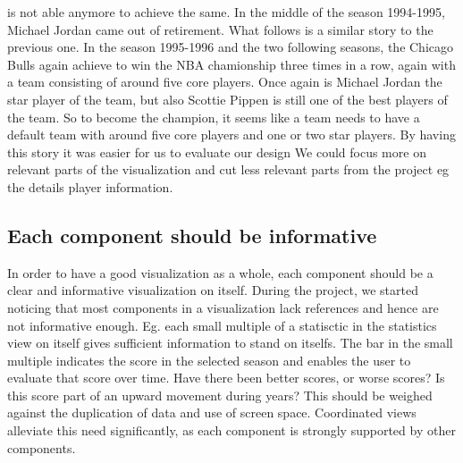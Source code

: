 \documentclass[]{sigchi}
\begin{document}
is not able anymore to achieve the same. In the middle of the season 1994-1995, Michael Jordan came out of retirement. What follows is a similar story to the previous one. In the season 1995-1996 and the two following seasons, the Chicago 
Bulls again achieve to win the NBA chamionship three times in a row, again with a  team consisting of around five core players. Once again is Michael Jordan the star 
player of the team, but also Scottie Pippen is still one of the best players of the team. So to become the champion, it seems like a team needs to have a default team with around five core players and one or two star players.
By having this story it was easier for us to evaluate our design We could focus more on relevant parts of the visualization and cut less relevant parts from the project eg the details player information.


\subsection{Each component should be informative}
In order to have a good visualization as a whole, each component should be a
clear and informative visualization on itself. During the project, we started noticing that most components in a visualization lack references and hence are not informative enough. Eg. each small multiple of a statisctic in the statistics view on itself gives sufficient information to stand on itselfs. The bar in the small multiple indicates the score in the selected season and enables the user to evaluate that score over time. Have there been better scores, or worse scores? Is this score
part of an upward movement during years? This should be weighed against the
duplication of data and use of screen space. Coordinated views alleviate this
need significantly, as each component is strongly supported by other
components.
\end{document}
